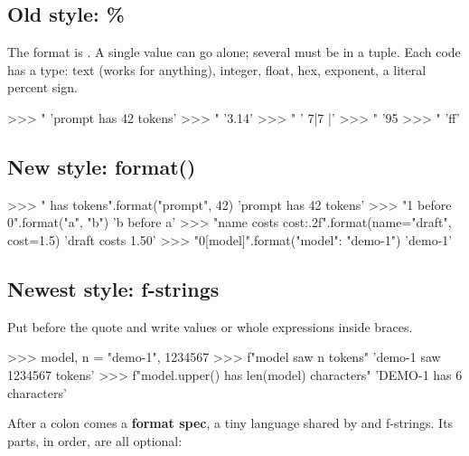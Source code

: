\subsection{Old style: \%}

The format is . A single value can go alone; several must be in a tuple.
Each \code{\%} code has a type:  text (works for anything),  integer,  float,
 hex,  exponent, \code{\%\%} a literal percent sign.

\begin{pycode}
>>> "%
'prompt has 42 tokens'
>>> "%
'3.14'
>>> "%
'    7|7    |'
>>> "%
'95%
>>> "%
'ff'
\end{pycode}

\subsection{New style: format()}

\begin{pycode}
>>> "{} has {} tokens".format("prompt", 42)
'prompt has 42 tokens'
>>> "{1} before {0}".format("a", "b")
'b before a'
>>> "{name} costs {cost:.2f}".format(name="draft", cost=1.5)
'draft costs 1.50'
>>> "{0[model]}".format({"model": "demo-1"})
'demo-1'
\end{pycode}

\subsection{Newest style: f-strings}

Put  before the quote and write values or whole expressions inside braces.

\begin{pycode}
>>> model, n = "demo-1", 1234567
>>> f"{model} saw {n} tokens"
'demo-1 saw 1234567 tokens'
>>> f"{model.upper()} has {len(model)} characters"
'DEMO-1 has 6 characters'
\end{pycode}

After a colon comes a \textbf{format spec}, a tiny language shared by  and f-strings.
Its parts, in order, are all optional:

